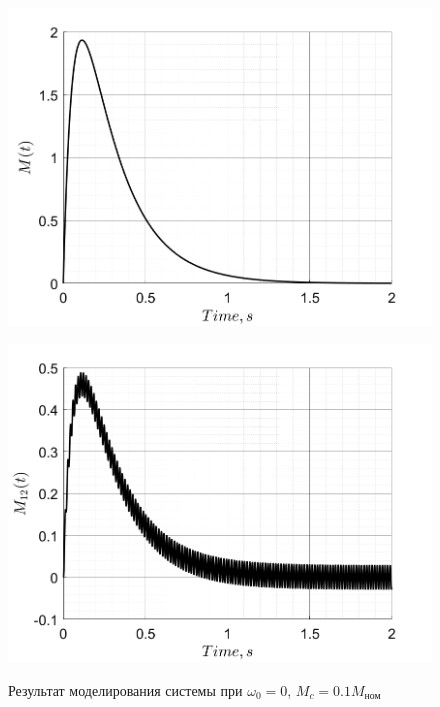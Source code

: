 \begin{figure}[!h]
\begin{minipage}{0.5\textwidth}
        \includegraphics[width = \textwidth]{img/task21_M}
        \label{fig:img/task21_M}
    \end{minipage}%
    \begin{minipage}{0.5\textwidth}
        \centering
        \includegraphics[width = \textwidth]{img/task21_M12}
        \label{fig:img/task21_M12}
    \end{minipage}%
    \caption{Результат моделирования системы при $\omega_0 = 0$, $M_c = 0.1M_\text{ном}$}
\end{figure}

